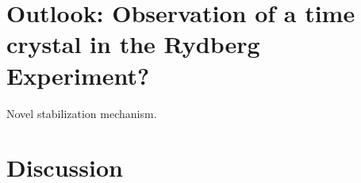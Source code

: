 \chapter{Outlook: Observation of a time crystal in the Rydberg Experiment?}
Novel stabilization mechanism.

\chapter{Discussion}\label{ch:}

